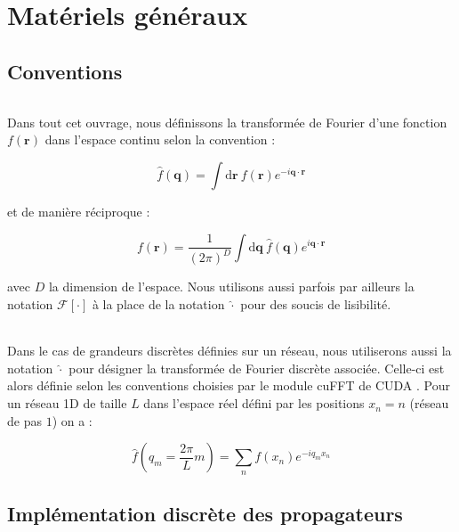 \appendix
\appendixpage
\addappheadtotoc

\setcounter{chapter}{0}

\chapter{Matériels généraux}

\section{Conventions}

\label{sec:conv_fourier}

\subparagraph{}Dans tout cet ouvrage, nous définissons la transformée de Fourier d'une fonction $f(\mathbf{r})$ dans l'espace continu selon la convention :

\begin{equation}
	\hat{f}(\mathbf{q}) = \int \mathrm{d}\mathbf{r}~f(\mathbf{r})e^{-i\mathbf{q}\cdot\mathbf{r}}
\end{equation}

\noindent et de manière réciproque :

\begin{equation}
	f(\mathbf{r}) = \frac{1}{(2\pi)^D}\int \mathrm{d}\mathbf{q}~\hat{f}(\mathbf{q})e^{i\mathbf{q}\cdot\mathbf{r}}
\end{equation}

\noindent avec $D$ la dimension de l'espace. Nous utilisons aussi parfois par ailleurs la notation $\mathcal{F}[\cdot]$ à la place de la notation $\hat{\cdot}$ pour des soucis de lisibilité.

\subparagraph{}Dans le cas de grandeurs discrètes définies sur un réseau, nous utiliserons aussi la notation $\hat{\cdot}$ pour désigner la transformée de Fourier discrète associée. Celle-ci est alors définie selon les conventions choisies par le module cuFFT de CUDA \cite{cuda}. Pour un réseau 1D de taille $L$ dans l'espace réel défini par les positions $x_n = n$ (réseau de pas $1$) on a :

\begin{equation}
	\hat{f}(q_m = \frac{2\pi}{L}m) = \sum_{n} f(x_n)e^{-i q_m x_n}
	\label{eq:TFdisc}
\end{equation}

\section{Implémentation discrète des propagateurs}

